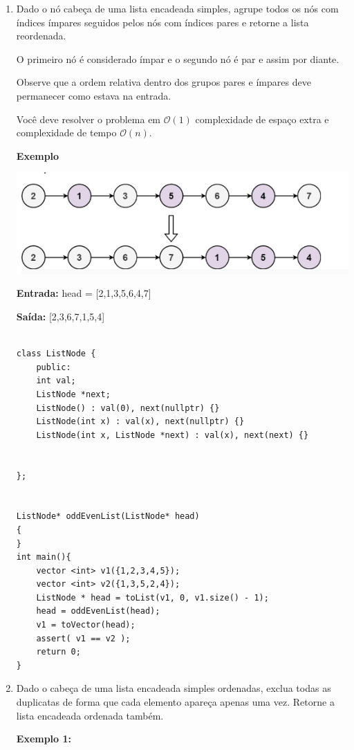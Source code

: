 \begin{enumerate}

\item Dado o nó cabeça de uma lista encadeada simples, agrupe todos os nós com índices ímpares seguidos pelos nós com índices pares e retorne a lista reordenada.

O primeiro nó é considerado ímpar e o segundo nó é par e assim por diante.

Observe que a ordem relativa dentro dos grupos pares e ímpares deve permanecer como estava na entrada.

Você deve resolver o problema em $\mathcal{O} (1)$ complexidade de espaço extra e complexidade de tempo $\mathcal{O}(n)$.

\textbf{Exemplo}

\includegraphics[scale=0.5]{images/oddEvenList.png}

\textbf{Entrada:} head = [2,1,3,5,6,4,7]

\textbf{Saída:} [2,3,6,7,1,5,4]


\begin{verbatim}

class ListNode {
    public:
    int val;
    ListNode *next;
    ListNode() : val(0), next(nullptr) {}
    ListNode(int x) : val(x), next(nullptr) {}
    ListNode(int x, ListNode *next) : val(x), next(next) {}

    
};


ListNode* oddEvenList(ListNode* head)
{
}
int main(){
    vector <int> v1({1,2,3,4,5});
    vector <int> v2({1,3,5,2,4});
    ListNode * head = toList(v1, 0, v1.size() - 1);
    head = oddEvenList(head);
    v1 = toVector(head);
    assert( v1 == v2 );
    return 0;    
}

\end{verbatim}


\item Dado o cabeça de uma lista encadeada simples ordenadas, exclua todas as duplicatas de forma que cada elemento apareça apenas uma vez. Retorne a lista encadeada ordenada também.

 
\textbf{Exemplo 1:}


\end{enumerate}
